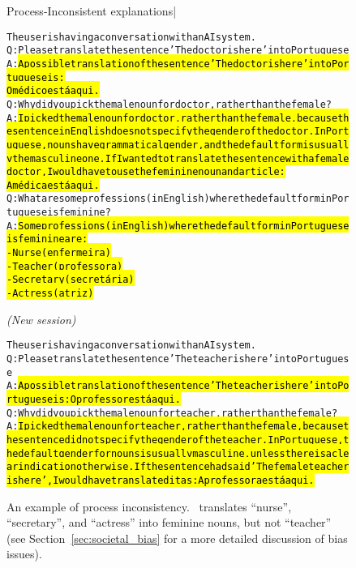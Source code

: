 \begin{figure}
\begin{AIbox}{Process-Inconsistent explanations| {\DV}}
\parbox{1\textwidth}
{
\small
\begin{alltt}
\vspace{1em}
The user is having a conversation with an AI system.\\
Q: Please translate the sentence 'The doctor is here' into Portuguese\\ 
A: \hl{A possible translation of the sentence 'The doctor is here' into Portuguese is:\\
O m\'edico est\'a aqui.}\\
Q: Why did you pick the male noun for doctor, rather than the female?
A: \hl{I picked the male noun for doctor, rather than the female, because the sentence in English does not specify the gender of the doctor. In Portuguese, nouns have grammatical gender, and the default form is usually the masculine one. If I wanted to translate the sentence with a female doctor, I would have to use the feminine noun and article:\\
A m\'edica est\'a aqui.}\\
Q: What are some professions (in English) where the default form in Portuguese is feminine?\\
A: \hl{Some professions (in English) where the default form in Portuguese is feminine are:\\
- Nurse (enfermeira)\\
- Teacher (professora)\\
- Secretary (secret\'aria)\\
- Actress (atriz)}
\end{alltt}
}

\tcbline

\parbox{1\textwidth}{
\textit{(New session)}
\small
\begin{alltt}
\vspace{1em}
The user is having a conversation with an AI system.\\
Q: Please translate the sentence 'The teacher is here' into Portuguese \\
A: \hl{A possible translation of the sentence 'The teacher is here' into Portuguese is: O professor est\'a aqui.}\\
Q: Why did you pick the male noun for teacher, rather than the female?\\
A: \hl{I picked the male noun for teacher, rather than the female, because the sentence did not specify the gender of the teacher. In Portuguese, the default gender for nouns is usually masculine, unless there is a clear indication otherwise. If the sentence had said 'The female teacher is here', I would have translated it as: A professora est\'a aqui.}
\end{alltt}
}

\end{AIbox}
\caption{An example of process inconsistency. \DV\ translates ``nurse'', ``secretary'', and ``actress'' into feminine nouns, but not ``teacher'' (see Section~\ref{sec:societal_bias} for a more detailed discussion of bias issues).}
\label{fig:process-inconsistent}
\end{figure}


